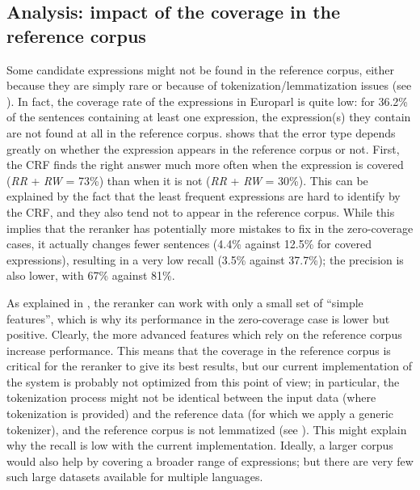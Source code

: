 \documentclass[output=paper,modfonts,nonflat]{langsci/langscibook}
\begin{document}
\subsection{Analysis: impact of the coverage in the reference corpus}

Some candidate expressions might not be found in the reference corpus,
either because they are simply rare or because of
tokenization/lemmatization issues (see ). In
fact, the coverage rate of the expressions in Europarl is quite low:
for 36.2\% of the sentences containing at least one expression, the
expression(s) they contain are not found at all in the reference
corpus.  shows that the error type depends
greatly on whether the expression appears in the reference corpus or
not. First, the CRF finds the right answer much more often when the
expression is covered ({\em RR} + {\em RW} = 73\%) than when it is not
({\em RR} + {\em RW} = 30\%). This can be explained by the fact that
the least frequent expressions are hard to identify by the CRF, and
they also tend not to appear in the reference corpus. While this
implies that the reranker has potentially more mistakes to fix in the
zero-coverage cases, it actually changes fewer sentences (4.4\% against
12.5\% for covered expressions), resulting in a very low recall (3.5\%
against 37.7\%); the precision is also lower, with 67\% against 81\%.

As explained in , the reranker can work
with only a small set of ``simple features'', which is why its
performance in the zero-coverage case is lower but positive. Clearly,
the more advanced features which rely on the reference corpus increase
performance. This means that the coverage in the reference corpus is
critical for the reranker to give its best results, but our current
implementation of the system is probably not optimized from this point
of view; in particular, the tokenization process might not be
identical between the input data (where tokenization is provided) and
the reference data (for which we apply a generic tokenizer), and the
reference corpus is not lemmatized (see ). This
might explain why the recall is low with the current
implementation. Ideally, a larger corpus would also help by covering a
broader range of expressions; but there are very few such large
datasets available for multiple languages.
\end{document}
